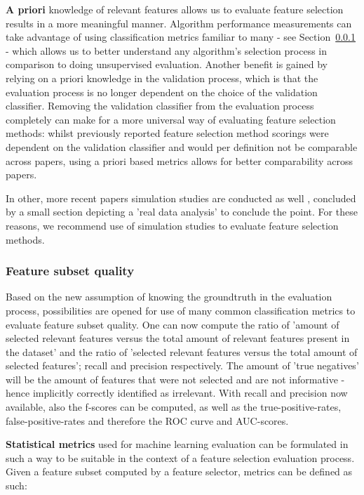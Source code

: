 \documentclass{article}
\begin{document}
\textbf{A priori} knowledge of relevant features allows us to evaluate feature selection results in a more meaningful manner. Algorithm performance measurements can take advantage of using classification metrics familiar to many - see Section~\ref{sec:evaluation-statistical-tools} - which allows us to better understand any algorithm's selection process in comparison to doing unsupervised evaluation. Another benefit is gained by relying on a priori knowledge in the validation process, which is that the evaluation process is no longer dependent on the choice of the validation classifier. Removing the validation classifier from the evaluation process completely can make for a more universal way of evaluating feature selection methods: whilst previously reported feature selection method scorings were dependent on the validation classifier and would per definition not be comparable across papers, using a priori based metrics allows for better comparability across papers.

In other, more recent papers simulation studies are conducted as well \citep{JMLR:v21:18-567} \citep{JMLR:v21:19-071} \citep{JMLR:v21:19-537}, concluded by a small section depicting a 'real data analysis' to conclude the point. For these reasons, we recommend use of simulation studies to evaluate feature selection methods.

\subsubsection{Feature subset quality}\label{sec:evaluation-statistical-tools}
Based on the new assumption of knowing the groundtruth in the evaluation process, possibilities are opened for use of many common classification metrics to evaluate feature subset quality. One can now compute the ratio of 'amount of selected relevant features versus the total amount of relevant features present in the dataset' and the ratio of 'selected relevant features versus the total amount of selected features'; recall and precision respectively. The amount of 'true negatives' will be the amount of features that were not selected and are not informative - hence implicitly correctly identified as irrelevant. With recall and precision now available, also the f-scores can be computed, as well as the true-positive-rates, false-positive-rates and therefore the ROC curve and AUC-scores.

\textbf{Statistical metrics} used for machine learning evaluation can be formulated in such a way to be suitable in the context of a feature selection evaluation process. Given a feature subset computed by a feature selector, metrics can be defined as such:
\end{document}
